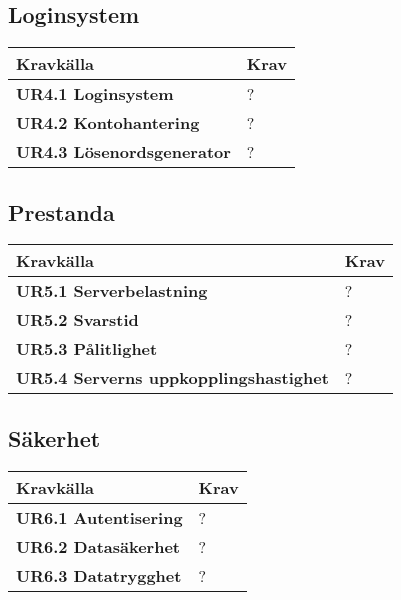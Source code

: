 \documentclass[a4paper, twoside, 11pt, titlepage]{article}
\begin{document}
	\subsection{Loginsystem}


	\begin {table} [ht] \begin{tabular} {  p{5.5cm} p{9.6cm} }
		\hline
		\sffamily\textbf{Kravkälla} & \sffamily\textbf{Krav } \\
		\hline
		\sffamily\textbf{UR4.1 Loginsystem} & ?  \\
		\hline
		\sffamily\textbf{UR4.2 Kontohantering} & ?  \\
		\hline
		\sffamily\textbf{UR4.3 Lösenordsgenerator} & ?  \\
		\hline
	\end{tabular} \end{table} \FloatBarrier


	\subsection{Prestanda}


	\begin {table} [ht] \begin{tabular} {  p{5.5cm} p{9.6cm} }
		\hline
		\sffamily\textbf{Kravkälla} & \sffamily\textbf{Krav } \\
		\hline
		\sffamily\textbf{UR5.1 Serverbelastning} & ?  \\
		\hline
		\sffamily\textbf{UR5.2 Svarstid} & ?  \\
		\hline
		\sffamily\textbf{UR5.3 Pålitlighet} & ?  \\
		\hline
		\sffamily\textbf{UR5.4 Serverns uppkopplingshastighet} & ?  \\
		\hline
	\end{tabular} \end{table} \FloatBarrier


	\subsection{Säkerhet}


	\begin {table} [ht] \begin{tabular} {  p{5.5cm} p{9.6cm} }
		\hline
		\sffamily\textbf{Kravkälla} & \sffamily\textbf{Krav } \\
		\hline
		\sffamily\textbf{UR6.1 Autentisering} & ?  \\
		\hline
		\sffamily\textbf{UR6.2 Datasäkerhet} & ?  \\
		\hline
		\sffamily\textbf{UR6.3 Datatrygghet} & ?  \\
		\hline
	\end{tabular} \end{table} \FloatBarrier
\end{document}
